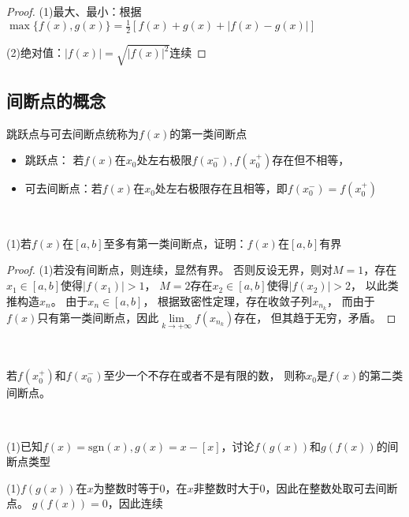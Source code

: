 \begin{proof}
  (1)最大、最小：根据$\max \{f(x),g(x)\} = \frac{1}{2}[f(x) + g(x) + |f(x) - g(x)|]$

  (2)绝对值：$|f(x)| = \sqrt{|f(x)|^2}$连续
\end{proof}

\subsection{间断点的概念}

\begin{definition}[第一类间断点]
  跳跃点与可去间断点统称为$f(x)$的第一类间断点
  \begin{itemize}
  \item 跳跃点： 若$f(x)$在$x_0$处左右极限$f(x_0^-), f(x_0^+)$存在但不相等，
  \item 可去间断点：若$f(x)$在$x_0$处左右极限存在且相等，即$f(x_0^-) = f(x_0^+)$
  \end{itemize}
\end{definition}

~

\begin{exercise}[第一类间断点的性质]
  (1)若$f(x)$在$[a,b]$至多有第一类间断点，证明：$f(x)$在$[a,b]$有界
\end{exercise}

\begin{proof}
  (1)若没有间断点，则连续，显然有界。
  否则反设无界，则对$M = 1$，存在$x_1 \in [a,b]$使得$|f(x_1)| > 1$，
  $M = 2$存在$x_2 \in [a,b]$使得$|f(x_2)| > 2$，
  以此类推构造$x_n$。
  由于$x_n \in [a,b]$，
  根据致密性定理，存在收敛子列$x_{n_k}$，
  而由于$f(x)$只有第一类间断点，因此$\lim \limits _{k \rightarrow +\infty}f(x_{n_k})$存在，
  但其趋于无穷，矛盾。
\end{proof}

~

\begin{definition}[第二类间断点]
  若$f(x_0^+)$和$f(x_0^-)$至少一个不存在或者不是有限的数，
  则称$x_0$是$f(x)$的第二类间断点。
\end{definition}

~

\begin{exercise}[判断间断点类型]
  (1)已知$f(x) = \text{sgn}(x),g(x )= x - [x]$，讨论$f(g(x))$和$g(f(x))$的间断点类型
\end{exercise}

\begin{solution}
  (1)$f(g(x))$在$x$为整数时等于$0$，在$x$非整数时大于$0$，因此在整数处取可去间断点。
  $g(f(x)) = 0$，因此连续
\end{solution}

